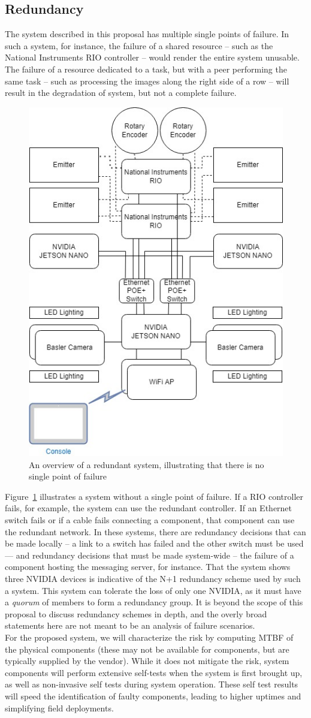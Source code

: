 \documentclass[12pt]{article}
\begin{document}
\subsection{Redundancy}
The system described in this proposal has multiple single points of failure. In such a system, for instance, the failure of a shared resource -- such as the National Instruments RIO controller -- would render the entire system unusable. The failure of a resource dedicated to a task, but with a peer performing the same task -- such as processing the images along the right side of a row -- will result in the degradation of system, but not a complete failure.
\begin{figure}[H]
	\centering
	\includegraphics[width=0.4\linewidth]{./figures/system-overview-Page-2.jpg}
	\caption[An overview of a redundant system]{An overview of a redundant system, illustrating that there is no single point of failure}
	\label{fig:system-overview-redundant}
\end{figure}

Figure~\ref{fig:system-overview-redundant} illustrates a system without a single point of failure. If a RIO controller fails, for example, the system can use the redundant controller. If an Ethernet switch fails or if a cable fails connecting a component, that component can use the redundant network. In these systems, there are redundancy decisions that can be made locally -- a link to a switch has failed and the other switch must be used --- and redundancy decisions that must be made system-wide -- the failure of a component hosting the messaging server, for instance. That the system shows three NVIDIA devices is indicative of the N+1 redundancy scheme used by such a system. This system can tolerate the loss of only one NVIDIA, as it must have a \textit{quorum} of members to form a redundancy group. It is beyond the scope of this proposal to discuss redundancy schemes in depth, and the overly broad statements here are not meant to be an analysis of failure scenarios. \\
For the proposed system, we will characterize the risk by computing MTBF of the physical components (these may not be available for components, but are typically supplied by the vendor).  While it does not mitigate the risk, system components will perform extensive self-tests when the system is first brought up, as well as non-invasive self tests during system operation. These self test results will speed the identification of faulty components, leading to higher uptimes and simplifying field deployments.
 
\end{document}
